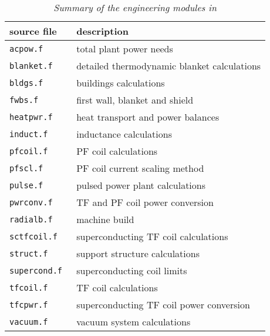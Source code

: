 
\begin{table}
\begin{center}

\begin{tabular}{||l||l||} \hline
source file     & description \\ \hline
\tt acpow.f     & \rm total plant power needs \\
\tt blanket.f   & \rm detailed thermodynamic blanket calculations \\
\tt bldgs.f     & \rm buildings calculations \\
\tt fwbs.f      & \rm first wall, blanket and shield \\
\tt heatpwr.f   & \rm heat transport and power balances \\
\tt induct.f    & \rm inductance calculations \\
\tt pfcoil.f    & \rm PF coil calculations \\
\tt pfscl.f     & \rm PF coil current scaling method \\
\tt pulse.f     & \rm pulsed power plant calculations \\
\tt pwrconv.f   & \rm TF and PF coil power conversion \\
\tt radialb.f   & \rm machine build \\
\tt sctfcoil.f  & \rm superconducting TF coil calculations \\
\tt struct.f    & \rm support structure calculations \\
\tt supercond.f & \rm superconducting coil limits \\
\tt tfcoil.f    & \rm TF coil calculations \\
\tt tfcpwr.f    & \rm superconducting TF coil power conversion \\
\tt vacuum.f    & \rm vacuum system calculations \\ \hline
\end{tabular}
\end{center}
\caption[TABLE_ENG]{{\it
Summary of the engineering modules in \PSD
}}
\label{tab:engineering}
\end{table}
